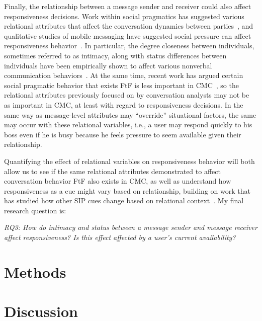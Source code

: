 \documentclass[12pt]{nuthesis}	%
\begin{document}
Finally, the relationship between a message sender and receiver could also affect responsiveness decisions. Work within social pragmatics has suggested various relational attributes that affect the conversation dynamics between parties~\citep{brown1987politeness,goldberg1990interrupting,west1979against,wolfson1990bulge}, and qualitative studies of mobile messaging have suggested social pressure can affect responsiveness behavior~\citep{church2013s}. In particular, the degree closeness between individuals, sometimes referred to as intimacy, along with status differences between individuals have been empirically shown to affect various nonverbal communication behaviors~\citep{guerrero1991waxing,henley1973power,leffler1982effects,sternglanz2004reading}.  At the same time, recent work has argued certain social pragmatic behavior that exists FtF is less important in CMC~\citep{schulze2017knowledge,stromer2015context}, so the relational attributes previously focused on by conversation analysts may not be as important in CMC, at least with regard to responsiveness decisions. In the same way as message-level attributes may ``override'' situational factors, the same may occur with these relational variables, i.e., a user may respond quickly to his boss even if he is busy because he feels pressure to seem available given their relationship.

Quantifying the effect of relational variables on responsiveness behavior will both allow us to see if the same relational attributes demonstrated to affect conversation behavior FtF also exists in CMC, as well as understand how responsiveness as a cue might vary based on relationship, building on work that has studied how other SIP cues change based on relational context~\citep[e.g.,][]{hancock2007expressing}. My final research question is:

\textit{RQ3: How do intimacy and status between a message sender and message receiver affect responsiveness? Is this effect affected by a user's current availability?}


\chapter{Methods}


\chapter{Discussion}

 \renewcommand\refname{\begin{centering}References\end{centering}}
 




\end{document}
